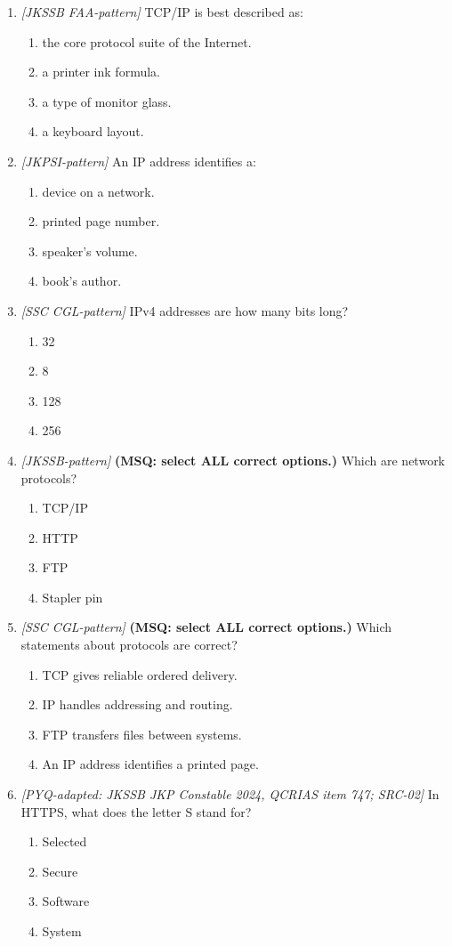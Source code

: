 \begin{enumerate}[label=\textbf{Q\arabic*.}, leftmargin=*]
\item \textit{[JKSSB FAA-pattern]} TCP/IP is best described as:
  \begin{enumerate}[label=\Alph*.]
    \item the core protocol suite of the Internet.
    \item a printer ink formula.
    \item a type of monitor glass.
    \item a keyboard layout.
  \end{enumerate}
\item \textit{[JKPSI-pattern]} An IP address identifies a:
  \begin{enumerate}[label=\Alph*.]
    \item device on a network.
    \item printed page number.
    \item speaker's volume.
    \item book's author.
  \end{enumerate}
\item \textit{[SSC CGL-pattern]} IPv4 addresses are how many bits long?
  \begin{enumerate}[label=\Alph*.]
    \item 32
    \item 8
    \item 128
    \item 256
  \end{enumerate}
\item \textit{[JKSSB-pattern]} \textbf{(MSQ: select ALL correct options.)} Which are network protocols?
  \begin{enumerate}[label=\Alph*.]
    \item TCP/IP
    \item HTTP
    \item FTP
    \item Stapler pin
  \end{enumerate}
\item \textit{[SSC CGL-pattern]} \textbf{(MSQ: select ALL correct options.)} Which statements about protocols are correct?
  \begin{enumerate}[label=\Alph*.]
    \item TCP gives reliable ordered delivery.
    \item IP handles addressing and routing.
    \item FTP transfers files between systems.
    \item An IP address identifies a printed page.
  \end{enumerate}
\item \textit{[PYQ-adapted: JKSSB JKP Constable 2024, QCRIAS item 747; SRC-02]} In HTTPS, what does the letter S stand for?
  \begin{enumerate}[label=\Alph*.]
\item Selected
   \item Secure
   \item Software
   \item System
  \end{enumerate}


\end{enumerate}
